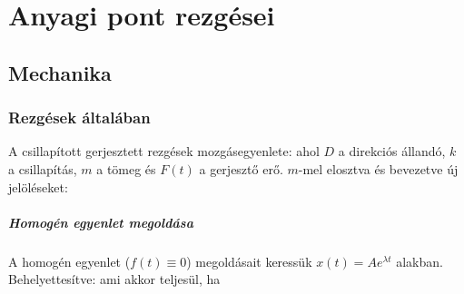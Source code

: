  \chapter{Anyagi pont rezg\'esei}
 
 \section{Mechanika} 
  
  \subsection{Rezgések általában}
   
   A csillapított gerjesztett rezgések mozgásegyenlete:
   ahol $D$ a direkciós állandó, $k$ a csillapítás, $m$ a tömeg és $F(t)$ a gerjesztő erő. $m$-mel elosztva és bevezetve új jelöléseket:
   \paragraph{Homogén egyenlet megoldása}
    
    A homogén egyenlet ($f(t)\equiv 0$) megoldásait keressük $x(t)=Ae^{\lambda t}$ alakban.
   Behelyettesítve:
    ami akkor teljesül, ha 
    
